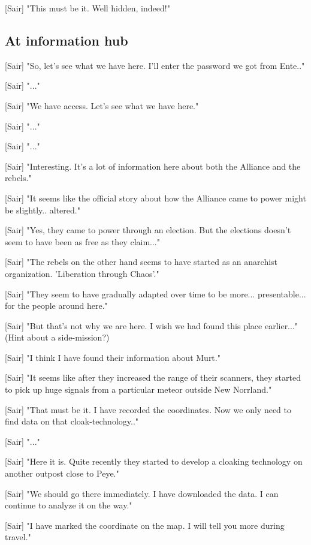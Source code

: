 \documentclass[a4paper,12pt]{article}
\begin{document}
[Sair] "This must be it. Well hidden, indeed!"

\subsection{At information hub}

[Sair] "So, let's see what we have here. I'll enter the password we got from Ente.."

[Sair] "..."

[Sair] "We have access. Let's see what we have here."

[Sair] "..."

[Sair] "..."

[Sair] "Interesting. It's a lot of information here about both the Alliance and the rebels."

[Sair] "It seems like the official story about how the Alliance came to power might be slightly.. altered."

[Sair] "Yes, they came to power through an election. But the elections doesn't seem to have been as free as they claim..."

[Sair] "The rebels on the other hand seems to have started as an anarchist organization. 'Liberation through Chaos'."

[Sair] "They seem to have gradually adapted over time to be more... presentable... for the people around here."

[Sair] "But that's not why we are here. I wish we had found this place earlier..." (Hint about a side-mission?)

[Sair] "I think I have found their information about Murt."

[Sair] "It seems like after they increased the range of their scanners, they started to pick up huge signals from a particular meteor outside New Norrland."

[Sair] "That must be it. I have recorded the coordinates. Now we only need to find data on that cloak-technology.."

[Sair] "..."

[Sair] "Here it is. Quite recently they started to develop a cloaking technology on another outpost close to Peye."

[Sair] "We should go there immediately. I have downloaded the data. I can continue to analyze it on the way."

[Sair] "I have marked the coordinate on the map. I will tell you more during travel."
\end{document}
